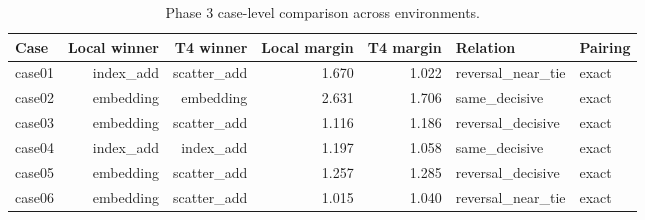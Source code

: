 \begin{table}[tbp]
\centering
\small
\caption{Phase 3 case-level comparison across environments.}
\label{tab:phase3-case-comparison}
\begin{tabular}{lrrrrll}
\toprule
Case & Local winner & T4 winner & Local margin & T4 margin & Relation & Pairing \\
\midrule
case01 & index\_add & scatter\_add & 1.670 & 1.022 & reversal\_near\_tie & exact \\
case02 & embedding & embedding & 2.631 & 1.706 & same\_decisive & exact \\
case03 & embedding & scatter\_add & 1.116 & 1.186 & reversal\_decisive & exact \\
case04 & index\_add & index\_add & 1.197 & 1.058 & same\_decisive & exact \\
case05 & embedding & scatter\_add & 1.257 & 1.285 & reversal\_decisive & exact \\
case06 & embedding & scatter\_add & 1.015 & 1.040 & reversal\_near\_tie & exact \\
\bottomrule
\end{tabular}
\end{table}